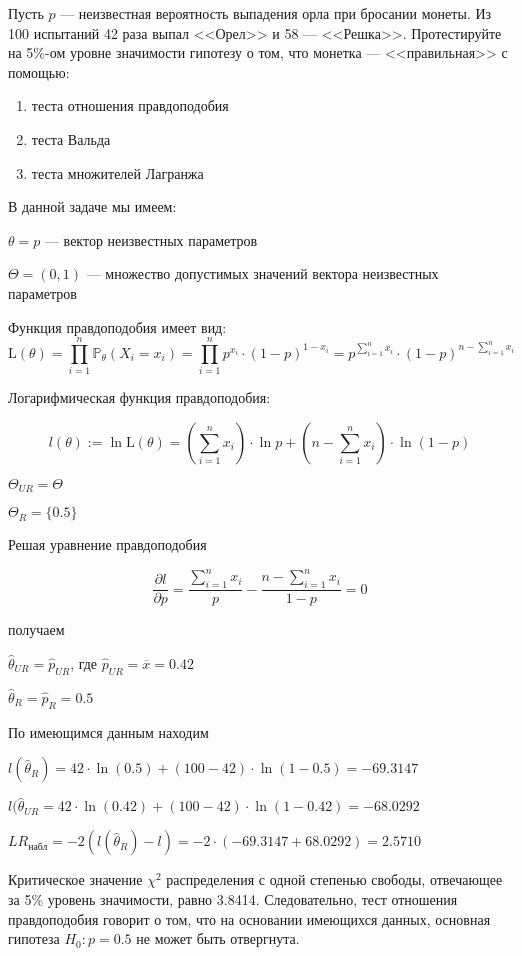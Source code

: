 \documentclass[pdftex,11pt,openany]{book}\usepackage[]{graphicx}\usepackage[]{color}
\begin{document}
\begin{problem}
Пусть $p$ --- неизвестная вероятность выпадения орла при бросании монеты. Из 100 испытаний  42 раза выпал <<Орел>> и 58 --- <<Решка>>. Протестируйте на 5\%-ом уровне значимости гипотезу о том, что монетка --- <<правильная>> с помощью: 
\begin{enumerate}
\item теста отношения правдоподобия
\item теста Вальда
\item теста множителей Лагранжа
\end{enumerate}
\end{problem}

\begin{solution}
В данной задаче мы имеем:

$\theta = p$ --- вектор неизвестных параметров

$\Theta = (0, 1)$ --- множество допустимых значений вектора неизвестных параметров

Функция правдоподобия имеет вид:
$$\text{L}(\theta) = \prod_{i=1}^n \mathbb{P}_{\theta}(X_i = x_i) = \prod_{i=1}^n p^{x_i} \cdot (1-p)^{1-x_i} = p^{\sum_{i=1}^n x_i} \cdot (1-p)^{n - \sum_{i=1}^n x_i}$$

Логарифмическая функция правдоподобия:

$$l(\theta) := \ln \text{L}(\theta) = \left( \sum_{i=1}^n x_i \right) \cdot \ln p + \left(n - \sum_{i=1}^n x_i \right) \cdot \ln (1 - p)$$

$\Theta_{UR} = \Theta$

$\Theta_{R} = \{0.5\}$

Решая уравнение правдоподобия

$$\frac{\partial l}{\partial p} = \frac{\sum_{i=1}^n x_i}{p} - \frac{n - \sum_{i=1}^n x_i}{1 - p} = 0$$

получаем

$\hat{\theta}_{UR} = \hat{p}_{UR}$, где $\hat{p}_{UR} = \overline{x} = 0.42$

$\hat{\theta}_{R} = \hat{p}_{R} = 0.5$

По имеющимся данным находим

$l(\hat{\theta}_{R}) = 42 \cdot \ln(0.5) + (100-42) \cdot \ln(1-0.5) = -69.3147$

$l(\hat{\theta}_{UR} = 42 \cdot \ln(0.42) + (100-42) \cdot \ln(1-0.42) = -68.0292$

$LR_{\text{набл}} = -2(l(\hat{\theta}_{R}) - l) = -2 \cdot (-69.3147 + 68.0292) = 2.5710$

Критическое значение $\chi^2$ распределения с одной степенью свободы, отвечающее за 5\% уровень значимости, равно 3.8414. Следовательно, тест отношения правдоподобия говорит о том, что на основании имеющихся данных, основная гипотеза $H_0: p = 0.5$ не может быть отвергнута.


\end{solution}
\end{document}

